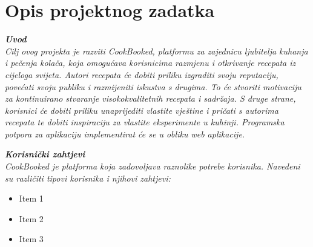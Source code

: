 \chapter{Opis projektnog zadatka}
		
		\textbf{\textit{Uvod}}\\
		
		\textit{Cilj ovog projekta je razviti CookBooked, platformu za zajednicu ljubitelja kuhanja i pečenja kolača, koja omogućava korisnicima razmjenu i otkrivanje recepata iz cijeloga svijeta. Autori recepata će dobiti priliku izgraditi svoju reputaciju, povećati svoju publiku i razmijeniti iskustva s drugima. To će stvoriti motivaciju za kontinuirano stvaranje visokokvalitetnih recepata i sadržaja. S druge strane, korisnici će dobiti priliku unaprijediti vlastite vještine i pričati s autorima recepata te dobiti inspiraciju za vlastite eksperimente u kuhinji. Programska potpora za aplikaciju implementirat će se u obliku web aplikacije.}
		

		\textbf{\textit{Korisnički zahtjevi}}\\
		
		\textit{CookBooked je platforma koja zadovoljava raznolike potrebe korisnika. Navedeni su različiti tipovi korisnika i njihovi zahtjevi:}
		\begin{itemize}
			\item Item 1
			\item Item 2
			\item Item 3
		\end{itemize}
		
		\eject
		
	